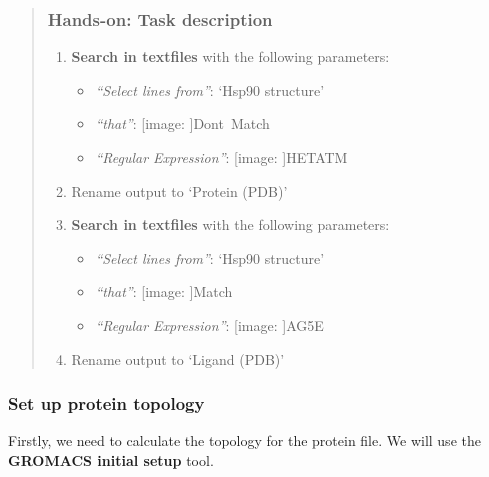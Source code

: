 \documentclass[twocolumn]{bmcart}%
\def\texttt{[image: ]}
\providecommand{\tightlist}{%
  \setlength{\itemsep}{0pt}\setlength{\parskip}{0pt}}
\begin{document}
\begin{quote}
\hypertarget{hands-on-task-description}{%
\subsubsection{Hands-on: Task
description}\label{hands-on-task-description}}

\begin{enumerate}
\def\labelenumi{\arabic{enumi}.}
\tightlist
\item
  \textbf{Search in textfiles} with the following parameters:
  \begin{itemize}
  \tightlist
  \item
    \emph{``Select lines from''}: `Hsp90 structure'\\
  \item
    \emph{``that''}: \texttt{Don\textquotesingle{}t\ Match}
  \item
    \emph{``Regular Expression''}: \texttt{HETATM}
  \end{itemize}
\item
  Rename output to `Protein (PDB)'
\item
  \textbf{Search in textfiles} with the following parameters:

  \begin{itemize}
  \tightlist
  \item
    \emph{``Select lines from''}: `Hsp90 structure'\\
  \item
    \emph{``that''}: \texttt{Match}
  \item
    \emph{``Regular Expression''}: \texttt{AG5E}
  \end{itemize}
\item
  Rename output to `Ligand (PDB)'
\end{enumerate}


\end{quote}

\hypertarget{set-up-protein-topology}{%
\subsubsection{Set up protein topology}\label{set-up-protein-topology}}

Firstly, we need to calculate the topology for the protein file. We will
use the \textbf{GROMACS initial setup} tool.
\end{document}
